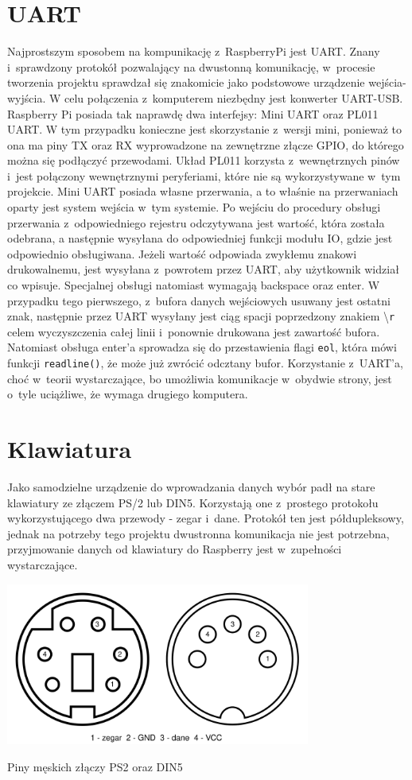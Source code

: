 \documentclass[shortabstract]{iithesis}
\begin{document}
\section{UART}
Najprostszym sposobem na kompunikację z~RaspberryPi jest UART. Znany i~sprawdzony protokół pozwalający na dwustonną komunikację, w~procesie tworzenia projektu sprawdzał się znakomicie jako podstowowe urządzenie wejścia-wyjścia. W celu połączenia z~komputerem niezbędny jest konwerter UART-USB.
Raspberry Pi posiada tak naprawdę dwa interfejsy: Mini UART oraz PL011 UART. W tym przypadku konieczne jest skorzystanie z~wersji mini, ponieważ to ona ma piny TX oraz RX wyprowadzone na zewnętrzne złącze GPIO, do którego można się podłączyć przewodami. Układ PL011 korzysta z~wewnętrznych pinów i~jest połączony wewnętrznymi peryferiami, które nie są wykorzystywane w~tym projekcie.
Mini UART posiada własne przerwania, a to właśnie na przerwaniach oparty jest system wejścia w~tym systemie. Po wejściu do procedury obsługi przerwania z~odpowiedniego rejestru odczytywana jest wartość, która została odebrana, a następnie wysyłana do odpowiedniej funkcji modułu IO, gdzie jest odpowiednio obsługiwana. Jeżeli wartość odpowiada zwykłemu znakowi drukowalnemu, jest wysyłana z~powrotem przez UART, aby użytkownik widział co wpisuje. Specjalnej obsługi natomiast wymagają backspace oraz enter. W przypadku tego pierwszego, z~bufora danych wejściowych usuwany jest ostatni znak, następnie przez UART wysyłany jest ciąg spacji poprzedzony znakiem \textbackslash \texttt{r} celem wyczyszczenia całej linii i~ponownie drukowana jest zawartość bufora. Natomiast obsługa enter'a sprowadza się do przestawienia flagi \texttt{eol}, która mówi funkcji \texttt{readline()}, że może już zwrócić odcztany bufor.
Korzystanie z~UART'a, choć w~teorii wystarczające, bo umożliwia komunikacje w~obydwie strony, jest o~tyle uciążliwe, że wymaga drugiego komputera.

\section{Klawiatura}
Jako samodzielne urządzenie do wprowadzania danych wybór padł na stare klawiatury ze złączem PS/2 lub DIN5. Korzystają one z~prostego protokołu wykorzystującego dwa przewody - zegar i~dane. Protokół ten jest półdupleksowy, jednak na potrzeby tego projektu dwustronna komunikacja nie jest potrzebna, przyjmowanie danych od klawiatury do Raspberry jest w~zupełności wystarczające.

\begingroup
\centering
\includegraphics[width=0.75\textwidth]{pinout.png}
\captionsetup{type=figure}
\caption{Piny męskich złączy PS2 oraz DIN5}
\endgroup
\end{document}
